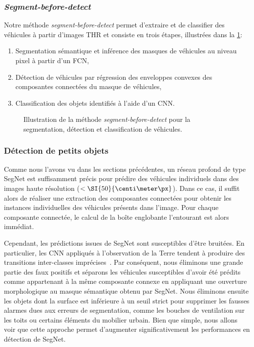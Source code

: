 \subsubsection{\emph{Segment-before-detect}}

Notre méthode \emph{segment-before-detect} permet d'extraire et de classifier des véhicules à partir d'images \gls{THR} et consiste en trois étapes, illustrées dans la \cref{fig:pipeline}:
\begin{enumerate}
\item Segmentation sémantique et inférence des masques de véhicules au niveau pixel à partir d'un \gls{FCN},
\item Détection de véhicules par régression des enveloppes convexes des composantes connectées du masque de véhicules,
\item Classification des objets identifiés à l'aide d'un \gls{CNN}.
\end{enumerate}

\begin{figure}[t]
  \resizebox{\textwidth}{!}{%
  	
  }
  \caption{Illustration de la méthode \emph{segment-before-detect} pour la segmentation, détection et classification de véhicules.}
  \label{fig:pipeline}
\end{figure}

\subsubsection{Détection de petits objets}

Comme nous l'avons vu dans les sections précédentes, un réseau profond de type SegNet est suffisamment précis pour prédire des véhicules individuels dans des images haute résolution ($<\SI{50}{\centi\meter\px}$). Dans ce cas, il suffit alors de réaliser une extraction des composantes connectées pour obtenir les instances individuelles des véhicules présents dans l'image. Pour chaque composante connectée, le calcul de la boîte englobante l'entourant est alors immédiat.

Cependant, les prédictions issues de SegNet sont susceptibles d'être bruitées. En particulier, les \gls{CNN} appliqués à l'observation de la Terre tendent à produire des transitions inter-classes imprécises~\cite{marmanis_classification_2017}. Par conséquent, nous éliminons une grande partie des faux positifs et séparons les véhicules susceptibles d'avoir été prédits comme appartenant à la même composante connexe en appliquant une ouverture morphologique au masque sémantique obtenu par SegNet. Nous éliminons ensuite les objets dont la surface est inférieure à un seuil strict pour supprimer les fausses alarmes dues aux erreurs de segmentation, comme les bouches de ventilation sur les toits ou certains éléments du mobilier urbain. Bien que simple, nous allons voir que cette approche permet d'augmenter significativement les performances en détection de SegNet.


